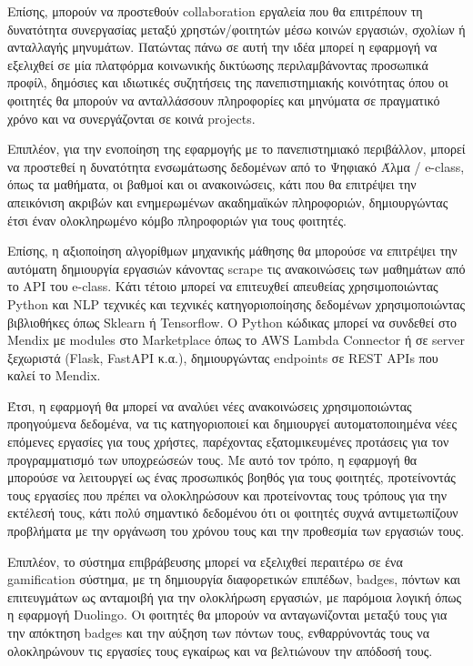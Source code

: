         Επίσης, μπορούν να προστεθούν collaboration εργαλεία που θα επιτρέπουν τη δυνατότητα συνεργασίας μεταξύ χρηστών/φοιτητών μέσω κοινών εργασιών, σχολίων ή ανταλλαγής μηνυμάτων. Πατώντας πάνω σε αυτή την ιδέα μπορεί η εφαρμογή να εξελιχθεί σε μία πλατφόρμα κοινωνικής δικτύωσης περιλαμβάνοντας προσωπικά προφίλ, δημόσιες και ιδιωτικές συζητήσεις της πανεπιστημιακής κοινότητας όπου οι φοιτητές θα μπορούν να ανταλλάσσουν πληροφορίες και μηνύματα σε πραγματικό χρόνο και να συνεργάζονται σε κοινά projects.

        Επιπλέον, για την ενοποίηση της εφαρμογής με το πανεπιστημιακό περιβάλλον, μπορεί να προστεθεί η δυνατότητα ενσωμάτωσης δεδομένων από το Ψηφιακό Άλμα / e-class, όπως τα μαθήματα, οι βαθμοί και οι ανακοινώσεις, κάτι που θα επιτρέψει την απεικόνιση ακριβών και ενημερωμένων ακαδημαϊκών πληροφοριών, δημιουργώντας έτσι έναν ολοκληρωμένο κόμβο πληροφοριών για τους φοιτητές.

        Επίσης, η αξιοποίηση αλγορίθμων μηχανικής μάθησης θα μπορούσε να επιτρέψει την αυτόματη δημιουργία εργασιών κάνοντας scrape τις ανακοινώσεις των μαθημάτων από το API του e-class. Κάτι τέτοιο μπορεί να επιτευχθεί απευθείας χρησιμοποιώντας Python και NLP τεχνικές και τεχνικές κατηγοριοποίησης δεδομένων χρησιμοποιώντας βιβλιοθήκες όπως Sklearn ή Tensorflow. Ο Python κώδικας μπορεί να συνδεθεί στο Mendix με modules στο Marketplace όπως το AWS Lambda Connector ή σε server ξεχωριστά (Flask, FastAPI κ.α.), δημιουργώντας endpoints σε REST APIs που καλεί το Mendix.

        Έτσι, η εφαρμογή θα μπορεί να αναλύει νέες ανακοινώσεις χρησιμοποιώντας προηγούμενα δεδομένα, να τις κατηγοριοποιεί και δημιουργεί αυτοματοποιημένα νέες επόμενες εργασίες για τους χρήστες, παρέχοντας εξατομικευμένες προτάσεις για τον προγραμματισμό των υποχρεώσεών τους. Με αυτό τον τρόπο, η εφαρμογή θα μπορούσε να λειτουργεί ως ένας προσωπικός βοηθός για τους φοιτητές, προτείνοντάς τους εργασίες που πρέπει να ολοκληρώσουν και προτείνοντας τους τρόπους για την εκτέλεσή τους, κάτι πολύ σημαντικό δεδομένου ότι οι φοιτητές συχνά αντιμετωπίζουν προβλήματα με την οργάνωση του χρόνου τους και την προθεσμία των εργασιών τους.

        Επιπλέον, το σύστημα επιβράβευσης μπορεί να εξελιχθεί περαιτέρω σε ένα gamification σύστημα, με τη δημιουργία διαφορετικών επιπέδων, badges, πόντων και επιτευγμάτων ως ανταμοιβή για την ολοκλήρωση εργασιών, με παρόμοια λογική όπως η εφαρμογή Duolingo. Οι φοιτητές θα μπορούν να ανταγωνίζονται μεταξύ τους για την απόκτηση badges και την αύξηση των πόντων τους, ενθαρρύνοντάς τους να ολοκληρώνουν τις εργασίες τους εγκαίρως και να βελτιώνουν την απόδοσή τους.

